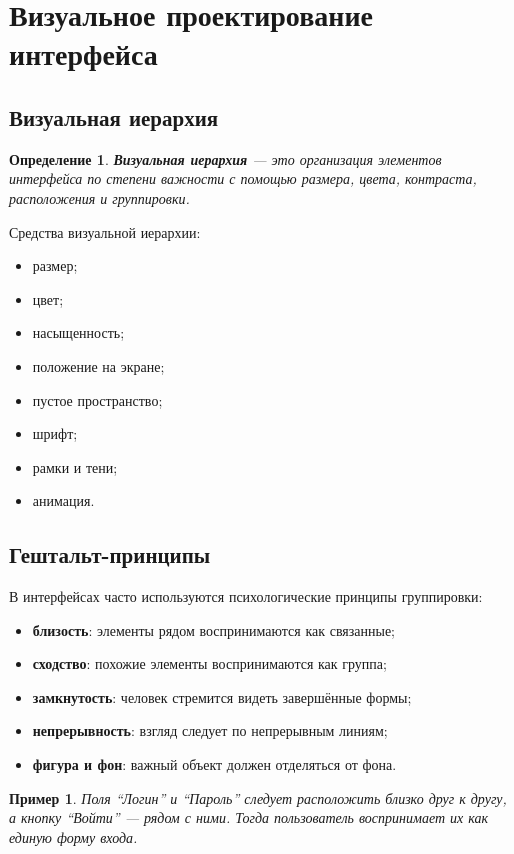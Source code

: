\documentclass[12pt,a4paper]{article}
\newtheorem{definition}{Определение}
\newtheorem{example}{Пример}
\begin{document}
\section{Визуальное проектирование интерфейса}

\subsection{Визуальная иерархия}

\begin{definition}
\textbf{Визуальная иерархия} --- это организация элементов интерфейса по степени важности с помощью размера, цвета, контраста, расположения и группировки.
\end{definition}

Средства визуальной иерархии:
\begin{itemize}
    \item размер;
    \item цвет;
    \item насыщенность;
    \item положение на экране;
    \item пустое пространство;
    \item шрифт;
    \item рамки и тени;
    \item анимация.
\end{itemize}

\subsection{Гештальт-принципы}

В интерфейсах часто используются психологические принципы группировки:

\begin{itemize}
    \item \textbf{близость}: элементы рядом воспринимаются как связанные;
    \item \textbf{сходство}: похожие элементы воспринимаются как группа;
    \item \textbf{замкнутость}: человек стремится видеть завершённые формы;
    \item \textbf{непрерывность}: взгляд следует по непрерывным линиям;
    \item \textbf{фигура и фон}: важный объект должен отделяться от фона.
\end{itemize}

\begin{example}
Поля ``Логин'' и ``Пароль'' следует расположить близко друг к другу, а кнопку ``Войти'' --- рядом с ними. Тогда пользователь воспринимает их как единую форму входа.
\end{example}
\end{document}
